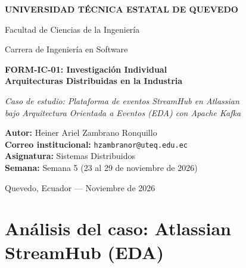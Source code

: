 \documentclass[11pt,a4paper]{article}
\begin{document}
\begin{titlepage}
    \centering
    \vspace*{1.5cm}
    {\Large\bfseries UNIVERSIDAD TÉCNICA ESTATAL DE QUEVEDO \par}
    \vspace{0.4cm}
    {\large Facultad de Ciencias de la Ingeniería \par}
    \vspace{0.3cm}
    {\normalsize Carrera de Ingeniería en Software \par}

    \vspace{2.5cm}
    {\LARGE\bfseries FORM-IC-01: Investigación Individual\\[0.25cm]
    Arquitecturas Distribuidas en la Industria \par}
    \vspace{0.6cm}
    {\large\itshape Caso de estudio: Plataforma de eventos StreamHub en Atlassian\\
    bajo Arquitectura Orientada a Eventos (EDA) con Apache Kafka \par}

    \vfill
    \begin{flushleft}
        \large
        \textbf{Autor:} Heiner Ariel Zambrano Ronquillo\\[0.25cm]
        \textbf{Correo institucional:} \texttt{hzambranor@uteq.edu.ec}\\[0.25cm]
        \textbf{Asignatura:} Sistemas Distribuidos\\[0.25cm]
        \textbf{Semana:} Semana 5 (23 al 29 de noviembre de 2026)
    \end{flushleft}

    \vspace{1.5cm}
    {\normalsize Quevedo, Ecuador --- Noviembre de 2026 \par}
\end{titlepage}

\section*{Análisis del caso: Atlassian StreamHub (EDA)}
\end{document}
